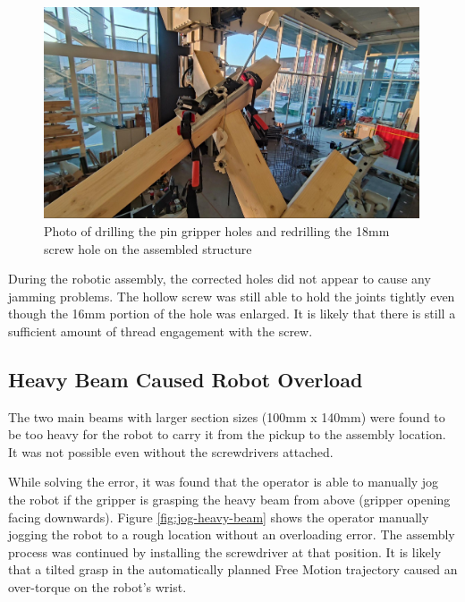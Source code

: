 \begin{figure}[!h]
    \centering
    \includegraphics[width=0.99\textwidth]{images/7b/img78.jpg}
    \caption{Photo of drilling the pin gripper holes and redrilling the 18mm screw hole on the assembled structure}
    \label{fig:photo-drill-18mm-hole}
\end{figure}


During the robotic assembly, the corrected holes did not appear to cause any jamming problems. The hollow screw was still able to hold the joints tightly even though the 16mm portion of the hole was enlarged. It is likely that there is still a sufficient amount of thread engagement with the screw.

\FloatBarrier

\subsection{Heavy Beam Caused Robot Overload}
\label{subsection:exploration-4-heavy-beam-caused-robot-overload}

The two main beams with larger section sizes (100mm x 140mm) were found to be too heavy for the robot to carry it from the pickup to the assembly location. It was not possible even without the screwdrivers attached.

While solving the error, it was found that the operator is able to manually jog the robot if the gripper is grasping the heavy beam from above (gripper opening facing downwards). Figure \ref{fig:jog-heavy-beam} shows the operator manually jogging the robot to a rough location without an overloading error. The assembly process was continued by installing the screwdriver at that position. It is likely that a tilted grasp in the automatically planned Free Motion trajectory caused an over-torque on the robot's wrist.

